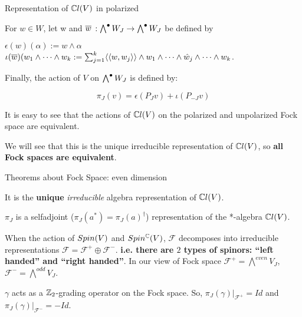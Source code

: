 \begin{frame}{Representation of $\mathbb C l(V)$ in polarized \fjv} %
    
    For $w \in W$, let w and $\overline{w}$ $:\bigwedge^\bullet W_J \to \bigwedge^\bullet W_J$ be defined by
    
    $\epsilon(w)(\alpha) := w \wedge \alpha$\\
    $\iota(\overline{w})(w_1 \wedge \cdots \wedge w_k := \sum_{j = 1}^k \langle\langle w, w_j \rangle\rangle \wedge w_1 \wedge \cdots \wedge \hat w_j \wedge \cdots  \wedge w_k$.
    
    Finally, the action of $V$ on $\bigwedge^\bullet W_J$ is defined by:
    
    \[\pi_J(v) = \epsilon(P_J v) + \iota(P_{-J} v)\]
    
    It is easy to see that the actions of $\mathbb C l(V)$ on the polarized and unpolarized Fock space are equivalent.
    
    We will see that this is the unique irreducible representation of $\mathbb C l(V)$, so \textbf{all Fock spaces are equivalent}.
    
\end{frame}

\begin{frame}{Theorems about Fock Space: even dimension} %
    \begin{theorem} It is the \textbf{unique} \emph{irreducible} algebra representation of $\mathbb C l(V)$.\end{theorem}%

    \begin{theorem}$\pi_J$ is a selfadjoint ($\pi_J(a^*) = \pi_J(a)^\dagger$) representation of the *-algebra $\mathbb C l(V)$.\end{theorem}%
    
    \begin{theorem}
    When the action of $Spin(V)$ and $Spin^\mathbb C(V)$, $\mathcal F$ decomposes into irreducible representations $\mathcal F = \mathcal F^+ \oplus \mathcal F^-$. \textbf{i.e. there are $2$ types of spinors: ``left handed'' and ``right handed''}. \tiny {In our view of Fock space $\mathcal F^+ = \bigwedge^{even}V_J$, $\mathcal F^- = \bigwedge^{odd}V_J$. }
    \end{theorem}
    
    \begin{proposition} $\gamma$ acts as a $\mathbb Z_2$-grading operator on the Fock space. So,  $\pi_J(\gamma)|_{\mathcal F^+} = Id$ and $\pi_J(\gamma)|_{\mathcal F^-} = -Id$. \end{proposition}%

\end{frame}


